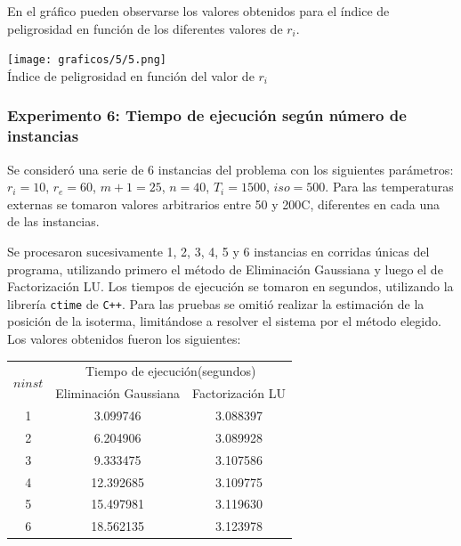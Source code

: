     En el gráfico pueden observarse los valores obtenidos para el índice de peligrosidad en función de los diferentes valores de $r_i$.

    \begin{center}
      \texttt{[image: graficos/5/5.png]} \\
      {\small Índice de peligrosidad en función del valor de $r_i$}
    \end{center}

  \subsubsection*{Experimento 6: Tiempo de ejecución según número de instancias}

    Se consideró una serie de 6 instancias del problema con los siguientes parámetros: $r_i = 10$, $r_e = 60$, $m+1 = 25$, $n = 40$, $T_i = 1500$, $iso = 500$. Para las temperaturas externas se tomaron valores arbitrarios entre 50 y 200{\degree}C, diferentes en cada una de las instancias.

    Se procesaron sucesivamente 1, 2, 3, 4, 5 y 6 instancias en corridas únicas del programa, utilizando primero el método de Eliminación Gaussiana y luego el de Factorización LU. Los tiempos de ejecución se tomaron en segundos, utilizando la librería \texttt{ctime} de \texttt{C++}. Para las pruebas se omitió realizar la estimación de la posición de la isoterma, limitándose a resolver el sistema por el método elegido. Los valores obtenidos fueron los siguientes:

      \begin{center}
        \begin{tabular}{c|c|c}
          \multirow{2}{*}{$ninst$} & \multicolumn{2}{c}{Tiempo de ejecución(segundos)} \\ 
          & Eliminación Gaussiana & Factorización LU \\ \hline
          1 & 3.099746 & 3.088397 \\
          2 & 6.204906 & 3.089928 \\
          3 & 9.333475 & 3.107586 \\
          4 & 12.392685 & 3.109775 \\
          5 & 15.497981 & 3.119630 \\
          6 & 18.562135 & 3.123978 \\
        \end{tabular}
      \end{center}

